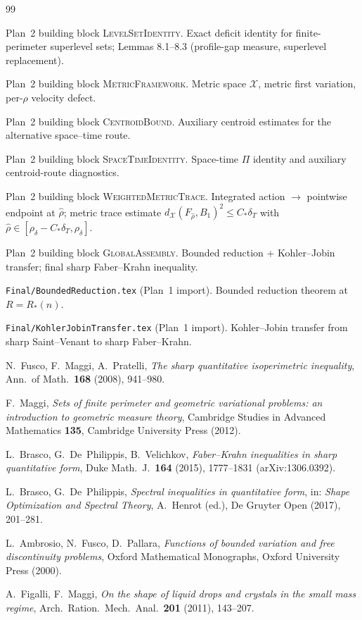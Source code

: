 \documentclass[11pt]{article}
\theoremstyle{definition}
\newcommand{\rhad}{\widehat\rho}
\newcommand{\X}{\mathcal X}
\begin{document}
\begin{thebibliography}{99}

Plan~2 building block \textsc{LevelSetIdentity}.
Exact deficit identity for finite-perimeter superlevel sets;
Lemmas 8.1--8.3 (profile-gap measure, superlevel replacement).

Plan~2 building block \textsc{MetricFramework}.
Metric space $\X$, metric first variation, per-$\rho$ velocity
defect.

Plan~2 building block \textsc{CentroidBound}.
Auxiliary centroid estimates for the alternative space--time route.

Plan~2 building block \textsc{SpaceTimeIdentity}.
Space-time $\Pi$ identity and auxiliary centroid-route diagnostics.

Plan~2 building block \textsc{WeightedMetricTrace}.
Integrated action $\to$ pointwise endpoint at $\rhad$; metric trace
estimate $d_{\X}(F_{\rhad},B_1)^2\le C_*\delta_T$ with
$\rhad\in[\rho_\delta-C_*\delta_T,\rho_\delta]$.

Plan~2 building block \textsc{GlobalAssembly}.
Bounded reduction + Kohler--Jobin transfer; final sharp Faber--Krahn
inequality.

\texttt{Final/BoundedReduction.tex} (Plan~1 import).
Bounded reduction theorem at $R=R_*(n)$.

\texttt{Final/KohlerJobinTransfer.tex} (Plan~1 import).
Kohler--Jobin transfer from sharp Saint--Venant to sharp
Faber--Krahn.

N.~Fusco, F.~Maggi, A.~Pratelli,
\emph{The sharp quantitative isoperimetric inequality},
Ann.\ of Math.\ \textbf{168} (2008), 941--980.

F.~Maggi,
\emph{Sets of finite perimeter and geometric variational problems:
an introduction to geometric measure theory},
Cambridge Studies in Advanced Mathematics \textbf{135},
Cambridge University Press (2012).

L.~Brasco, G.~De~Philippis, B.~Velichkov,
\emph{Faber--Krahn inequalities in sharp quantitative form},
Duke Math.\ J.\ \textbf{164} (2015), 1777--1831 (arXiv:1306.0392).

L.~Brasco, G.~De~Philippis,
\emph{Spectral inequalities in quantitative form},
in: \emph{Shape Optimization and Spectral Theory},
A.~Henrot (ed.), De Gruyter Open (2017), 201--281.

L.~Ambrosio, N.~Fusco, D.~Pallara,
\emph{Functions of bounded variation and free discontinuity problems},
Oxford Mathematical Monographs, Oxford University Press (2000).

A.~Figalli, F.~Maggi,
\emph{On the shape of liquid drops and crystals in the small mass regime},
Arch.\ Ration.\ Mech.\ Anal.\ \textbf{201} (2011), 143--207.

\end{thebibliography}
\end{document}
